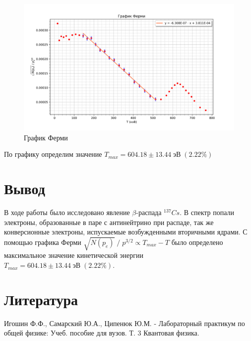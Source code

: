 \documentclass[a4paper]{article}
\begin{document}
\begin{enumerate}
    \begin{figure}[H]
        \begin{center}
        \includegraphics[scale = 0.7]{mkFermi.png}
        \caption{График Ферми}
        \label{g2}
        \end{center}
    \end{figure}

    По графику определим значение $T_{max} = 604.18 \pm 13.44\; \text{эВ} \;(2.22\%)$

\end{enumerate}

\section{Вывод}

В ходе работы было исследовано явление $\beta$-распада $^{137}Cs$. В спектр попали электроны, 
образованные в паре с антинейтрино при распаде, так же конверсионные электроны, испускаемые
возбужденными вторичными ядрами. С помощью графика Ферми $\sqrt{N(p_e)}\; / \; p^{3/2} \propto T_{max} - T$ 
было определено максимальное значение кинетической энергии $T_{max} = 604.18 \pm 13.44\; \text{эВ} \;(2.22\%)$.

\section{Литература}
Игошин Ф.Ф., Самарский Ю.А., Ципенюк Ю.М.  - Лабораторный практикум по общей физике: Учеб. пособие для вузов. Т. 3 Квантовая физика. 
\end{document}
